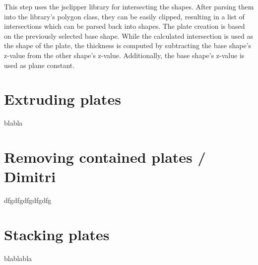 \documentclass[../ClassicThesis.tex]{subfiles}
\begin{document}

This step uses the jsclipper library for intersecting the shapes. After parsing them into the library's polygon class, they can be easily clipped, resulting in a list of intersections which can be parsed back into shapes. The plate creation is based on the previously selected base shape. While the calculated intersection is used as the shape of the plate, the thickness is computed by subtracting the base shape's z-value from the other shape's z-value. Additionally, the base shape's z-value is used as plane constant.

\section{Extruding plates}

blabla

\section{Removing contained plates / Dimitri}

dfgdfgdfgdfgdfg

\section{Stacking plates}

blablabla


\end{document}

